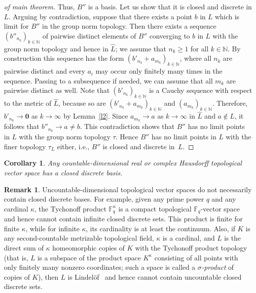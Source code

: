 \documentclass[a4paper]{amsart}
\newtheorem{corollary}{Corollary}
\theoremstyle{definition}
\newtheorem{remark}{Remark}
\let\ge\geqslant
\begin{document}
\begin{proof}[of main theorem]
Thus, $B''$ is a basis. Let us show that it is closed and discrete in $L$. Arguing by contradiction, suppose 
that there exists a point $b$ in $L$ which is limit for $B''$ in the group norm topology. Then there exists a 
sequence $(b''_{n_k})_{k\in \mathbb N}$ of pairwise distinct elements of $B''$ converging to $b$ in $L$ 
with the group norm topology and hence in $\widehat L$; we assume that $n_k\ge 1$ for all $k\in \mathbb N$. 
 By construction this sequence has the form $(b'_{n_k}+a_{m_k})_{k\in \mathbb N}$, 
where all $n_k$ are pairwise distinct and every $a_i$ may occur only finitely many times in the sequence. 
Passing to a subsequence if needed, 
we can assume that all $m_k$ are pairwise distinct as well. Note that $(b'_{n_k})_{k\in \mathbb N}$ is a Cauchy 
sequence with respect to the metric of $\widehat L$, because so are $(b'_{n_k}+a_{m_k})_{k\in \mathbb N}$ and $(a_{m_k})_{k\in \mathbb N}$. Therefore, 
$b'_{n_k}\to \mathbf 0$ as $k\to \infty$ by Lemma~\ref{l2}. Since $a_{m_k}\to a$ as $k\to \infty$ in $\widehat L$ and 
$a\notin L$, 
it follows that $b''_{n_k}\to a\ne b$. This contradiction shows that $B''$ has no limit points in $L$ with 
the group norm topology $\tau$. Hence $B''$ has no limit points in $L$ with the finer topology $\tau_L$ 
either, i.e., $B''$ is closed and discrete in~$L$. 
\end{proof}

\begin{corollary}
Any countable-dimensional real or complex  Hausdorff topological vector space has a closed discrete basis. 
\end{corollary}

\begin{remark}
Uncountable-dimensional topological vector spaces do not necessarily contain closed discrete bases. For 
example,  given any prime power $q$ and any cardinal $\kappa$, the Tychonoff product $\mathbb F_q^\kappa$ is a 
compact topological $\mathbb F_q$-vector space and hence cannot contain infinite closed discrete 
sets. This product is finite for finite $\kappa$, while for infinite $\kappa$, its cardinality is at least the 
continuum. Also, if $K$ is any second-countable metrizable topological field, $\kappa$ is a cardinal, and $L$ is the 
direct sum of $\kappa$ homeomorphic copies of $K$ with the Tychonoff product topology (that is, $L$ is a subspace 
of the product space $K^\kappa$ consisting of all points with only finitely many nonzero coordinates; such a space 
is called a \emph{$\sigma$-product} of copies of $K$), then $L$ is Lindel\"of~\cite[Proposition~3]{Corson} and 
hence cannot contain uncountable closed discrete sets.
\end{remark}
\end{document}
